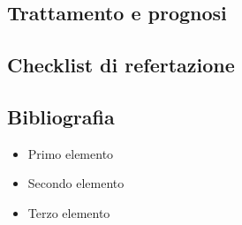 \subsection{Trattamento e prognosi}

\subsection{Checklist di refertazione}

\subsection{Bibliografia}
\small{
	
	
}


\begin{itemize}[label=$\square$] %
	\item Primo elemento
	\item Secondo elemento
	\item Terzo elemento
\end{itemize}